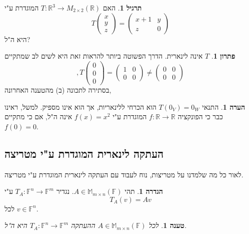 \documentclass[12pt]{report}
\theoremstyle{plain}
\newtheorem{proposition}[theorem]{טענה}
\theoremstyle{definition}
\newtheorem{definition}[theorem]{הגדרה}
\newtheorem{exercise}{תרגיל}[chapter]
\newtheorem{remark}{הערה}[chapter]
\newtheorem*{solution}{פתרון}
\newcommand{\R}{\mathbb{R}}
\newcommand{\F}{\mathbb{F}}
\newcommand{\M}{\mathbb{M}}
\newcommand{\0}{\mathbf{0}}
\begin{document}

\begin{exercise}
האם
$T:\R^3\to M_{2\times 2}(\R)$
המוגדרת ע"י
$$
T\begin{pmatrix}x\\y\\z\end{pmatrix}=\begin{pmatrix}
x+1 & y \\
z & 0
\end{pmatrix}
$$
היא ה"ל?
\end{exercise}

\begin{solution}
$T$
אינה לינארית. הדרך הפשוטה ביותר להראות זאת היא לשים לב שמתקיים
$$
,T\begin{pmatrix}0\\0\\0\end{pmatrix}=\begin{pmatrix}
1 & 0 \\
0 & 0
\end{pmatrix}\neq \begin{pmatrix}
0 & 0 \\
0 & 0
\end{pmatrix}
$$
בסתירה לתכונה (ב) מהטענה האחרונה,
\end{solution}

\begin{remark}
התנאי
$T(0_V)=0_W$
הוא הכרחי ללינאריות, אך הוא אינו מספיק. למשל, ראינו כבר כי הפונקציה
$f:\R\to\R$
המוגדרת ע"י
$f(x)=x^2$
אינה ה"ל, אם כי מתקיים
$f(0)=0$.
\end{remark}

\subsection{העתקה לינארית המוגדרת ע"י מטריצה}
לאור כל מה שלמדנו על מטריצות, נוח לעבוד עם העתקה לינארית המוגדרת ע"י מטריצה.

\begin{definition}
תהי 
$A\in\M_{m\times n}(\F)$.
נגדיר
$T_A:\F^n\to\F^m$
ע"י
$$
T_A(v)=Av
$$
לכל 
$v\in\F^n$.
\end{definition}

\begin{proposition}\label{prop:matrix-map}
לכל 
$A\in\M_{m\times n}(\F)$
ההעתקה
$T_A:\F^n\to\F^m$
היא ה"ל.
\end{proposition}
\end{document}
